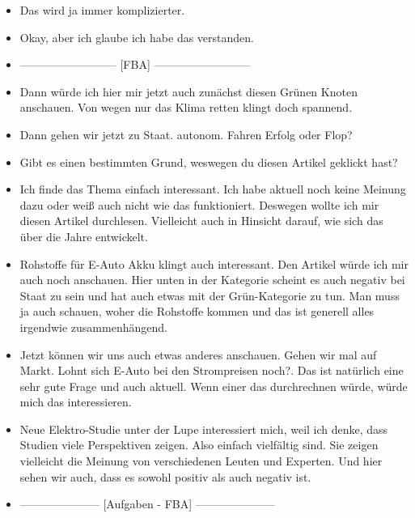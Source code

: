 {\begin{itemize}[]
            \item {} Das wird ja immer komplizierter.
            \item {} Okay, aber ich glaube ich habe das verstanden.
            \item {--------------------------} [FBA] {--------------------------}
            \item {} Dann würde ich hier mir jetzt auch zunächst diesen Grünen Knoten anschauen.
                  \flqq Von wegen nur das Klima retten\frqq{} klingt doch spannend.
            \item {} Dann gehen wir jetzt zu Staat. \flqq autonom. Fahren Erfolg oder Flop?\frqq{}
            \item {} Gibt es einen bestimmten Grund, weswegen du diesen Artikel geklickt hast?
            \item {} Ich finde das Thema einfach interessant.
                  Ich habe aktuell noch keine Meinung dazu oder weiß auch nicht wie das funktioniert.
                  Deswegen wollte ich mir diesen Artikel durchlesen.
                  Vielleicht auch in Hinsicht darauf, wie sich das über die Jahre entwickelt.
            \item {} \flqq Rohstoffe für E-Auto Akku\frqq{} klingt auch interessant.
                  Den Artikel würde ich mir auch noch anschauen.
                  Hier unten in der Kategorie scheint es auch negativ bei Staat zu sein und hat auch etwas mit der Grün-Kategorie zu tun.
                  Man muss ja auch schauen, woher die Rohstoffe kommen und das ist generell alles irgendwie zusammenhängend.
            \item {} Jetzt können wir uns auch etwas anderes anschauen.
                  Gehen wir mal auf Markt.
                  \flqq Lohnt sich E-Auto bei den Strompreisen noch?\frqq{}.
                  Das ist natürlich eine sehr gute Frage und auch aktuell.
                  Wenn einer das durchrechnen würde, würde mich das interessieren.
            \item {} \flqq Neue Elektro-Studie unter der Lupe\frqq{} interessiert mich, weil ich denke, dass Studien viele Perspektiven zeigen.
                  Also einfach vielfältig sind.
                  Sie zeigen vielleicht die Meinung von verschiedenen Leuten und Experten.
                  Und hier sehen wir auch, dass es sowohl positiv als auch negativ ist.
            \item {---------------------} [Aufgaben - FBA] {---------------------}

\end{itemize}}
